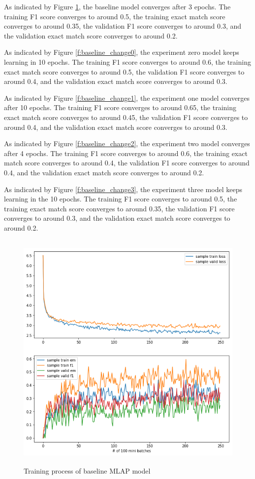 \documentclass[modernstyle,12pt]{sjsuthesis}
\theoremstyle{definition}
\begin{document}
As indicated by Figure \ref{f:mlap}, the baseline model converges after 3 epochs. The training F1 score converges to around 0.5, the training exact match score converges to around 0.35, the validation F1 score converges to around 0.3, and the validation exact match score converges to around 0.2.

As indicated by Figure \ref{f:baseline_change0}, the experiment zero model keeps learning in 10 epochs. The training F1 score converges to around 0.6, the training exact match score converges to around 0.5, the validation F1 score converges to around 0.4, and the validation exact match score converges to around 0.3.

As indicated by Figure \ref{f:baseline_change1}, the experiment one model converges after 10 epochs. The training F1 score converges to around 0.65, the training exact match score converges to around 0.45, the validation F1 score converges to around 0.4, and the validation exact match score converges to around 0.3.

As indicated by Figure \ref{f:baseline_change2}, the experiment two model converges after 4 epochs. The training F1 score converges to around 0.6, the training exact match score converges to around 0.4, the validation F1 score converges to around 0.4, and the validation exact match score converges to around 0.2.

As indicated by Figure \ref{f:baseline_change3}, the experiment three model keeps learning in the 10 epochs. The training F1 score converges to around 0.5, the training exact match score converges to around 0.35, the validation F1 score converges to around 0.3, and the validation exact match score converges to around 0.2.

\begin{figure}[htbp]\centering
  \includegraphics[width=12cm, height=12cm]{figures/match_corrected.png}
  \caption{Training process of baseline MLAP model}
  \label{f:mlap}
\end{figure}
\end{document}
